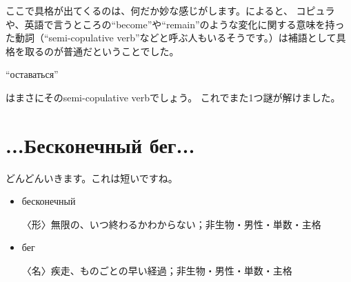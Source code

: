 \documentclass[12pt]{ltjsarticle}
\begin{document}
\bigskip

ここで具格が出てくるのは、何だか妙な感じがします。\citep[p. 205]{cubberley2002}によると、
コピュラや、英語で言うところの“become”や“remain”のような変化に関する意味を持った動詞（“semi-copulative verb”などと呼ぶ人もいるそうです。）は補語として具格を取るのが普通だということでした。
\begin{russian}“оставаться”\end{russian}はまさにそのsemi-copulative verbでしょう。
これでまた1つ謎が解けました。

\section{...Бесконечный бег...}
どんどんいきます。これは短いですね。
\begin{itemize}
    \item \begin{russian}бесконечный\end{russian}  〈形〉無限の、いつ終わるかわからない；非生物・男性・単数・主格
    \item \begin{russian}бег\end{russian}  〈名〉疾走、ものごとの早い経過；非生物・男性・単数・主格
\end{itemize}

\bigskip
\end{document}
